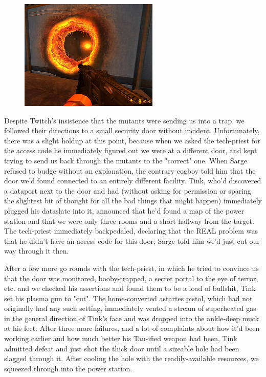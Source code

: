 \begin{figure}
	\begin{center}
		\includegraphics[width=\figwidth]{pics/18/8.png}
	\end{center}
\end{figure}
Despite Twitch's insistence that the mutants were sending us into a trap, we followed their directions to a small security door without incident. 
Unfortunately, there was a slight holdup at this point, because when we asked the tech-priest for the access code he immediately figured out we were at a different door, and kept trying to send us back through the mutants to the "correct" one. 
When Sarge refused to budge without an explanation, the contrary cogboy told him that the door we'd found connected to an entirely different facility. 
Tink, who'd discovered a dataport next to the door and had (without asking for permission or sparing the slightest bit of thought for all the bad things that might happen) immediately plugged his dataslate into it, announced that he'd found a map of the power station and that we were only three rooms and a short hallway from the target. 
The tech-priest immediately backpedaled, declaring that the REAL problem was that he didn't have an access code for this door; 
Sarge told him we'd just cut our way through it then.

After a few more go rounds with the tech-priest, in which he tried to convince us that the door was monitored, booby-trapped, a secret portal to the eye of terror, etc. 
and we checked his assertions and found them to be a load of bullshit, Tink set his plasma gun to "cut". 
The home-converted astartes pistol, which had not originally had any such setting, immediately vented a stream of superheated gas in the general direction of Tink's face and was dropped into the ankle-deep muck at his feet. 
After three more failures, and a lot of complaints about how it'd been working earlier and how much better his Tau-ified weapon had been, Tink admitted defeat and just shot the thick door until a sizeable hole had been slagged through it. 
After cooling the hole with the readily-available resources, we squeezed through into the power station.

